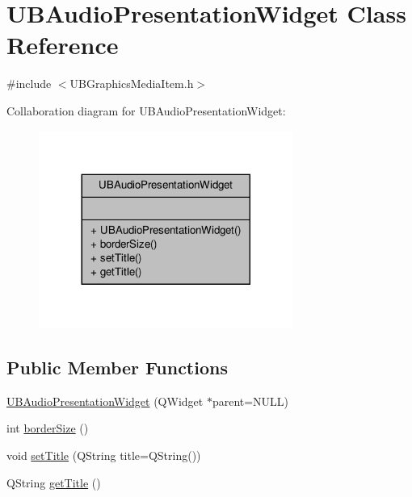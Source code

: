 \hypertarget{class_u_b_audio_presentation_widget}{\section{U\-B\-Audio\-Presentation\-Widget Class Reference}
\label{dc/d98/class_u_b_audio_presentation_widget}
}


{\ttfamily \#include $<$U\-B\-Graphics\-Media\-Item.\-h$>$}



Collaboration diagram for U\-B\-Audio\-Presentation\-Widget\-:
\nopagebreak
\begin{figure}[H]
\begin{center}
\leavevmode
\includegraphics[width=236pt]{d9/d56/class_u_b_audio_presentation_widget__coll__graph}
\end{center}
\end{figure}
\subsection*{Public Member Functions}
\begin{DoxyCompactItemize}
\item 
\hyperlink{class_u_b_audio_presentation_widget_a670b50e1da265fa235407798b44ce412}{U\-B\-Audio\-Presentation\-Widget} (Q\-Widget $\ast$parent=N\-U\-L\-L)
\item 
int \hyperlink{class_u_b_audio_presentation_widget_a8ce5adcb4dd824a47079c6dd119f3371}{border\-Size} ()
\item 
void \hyperlink{class_u_b_audio_presentation_widget_a72a9e2687d2f56a4cc09d483cd7ab95c}{set\-Title} (Q\-String title=Q\-String())
\item 
Q\-String \hyperlink{class_u_b_audio_presentation_widget_a8c89818dbf8fd78e9081895884389823}{get\-Title} ()
\end{DoxyCompactItemize}


